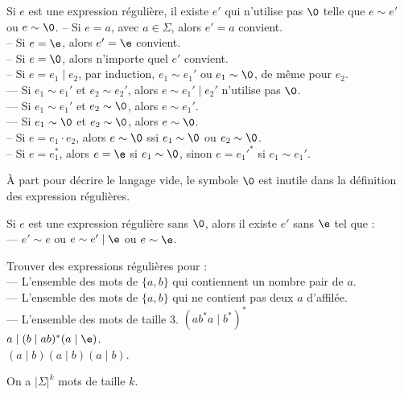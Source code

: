 \documentclass[french, 11pt]{article}
\renewcommand*{\S}{\Sigma}
\begin{document}
\begin{prop}{}{}
    Si $e$ est une expression régulière, il existe $e'$ qui n'utilise pas $\0$ telle que $e\sim e'$ ou $e\sim\0$.
    \tcblower
    -- Si $e=a$, avec $a\in\S$, alors $e'=a$ convient.\\
    -- Si $e=\e$, alors $e'=\e$ convient.\\
    -- Si $e=\0$, alors n'importe quel $e'$ convient.\\
    -- Si $e=e_1\mid e_2$, par induction, $e_1\sim e_1'$ ou $e_1\sim\0$, de même pour $e_2$.\\
    --- Si $e_1\sim e_1'$ et $e_2 \sim e_2'$, alors $e\sim e_1'\mid e_2'$ n'utilise pas $\0$.\\
    --- Si $e_1\sim e_1'$ et $e_2\sim\0$, alors $e\sim e_1'$.\\
    --- Si $e_1\sim \0$ et $e_2\sim \0$, alors $e\sim\0$.\\
    -- Si $e=e_1\cdot e_2$, alors $e\sim \0$ ssi $e_1\sim \0$ ou $e_2\sim \0$.\\
    -- Si $e=e_1^*$, alors $e=\e$ si $e_1\sim\0$, sinon $e=e_1'^*$ si $e_1\sim e_1'$.
\end{prop}

\begin{corr}{}{}
    À part pour décrire le langage vide, le symbole $\0$ est inutile dans la définition des expression régulières.
\end{corr}

\begin{prop}{}{}
    Si $e$ est une expression régulière sans $\0$, alors il existe $e'$ sans $\e$ tel que :\\
    --- $e'\sim e$ ou $e\sim e'\mid\e$ ou $e\sim \e$.
\end{prop}

\begin{ex}{}{}
    Trouver des expressions régulières pour :\\
    --- L'ensemble des mots de $\{a,b\}$ qui contiennent un nombre pair de $a$.\\
    --- L'ensemble des mots de $\{a,b\}$ qui ne contient pas deux $a$ d'affilée.\\
    --- L'ensemble des mots de taille 3.
    \tcblower
     $(ab^*a\mid b^*)^*$\\
     $a\mid(b \mid ab)^*(a\mid \e)$.\\
     $(a\mid b)(a\mid b)(a\mid b)$.
\end{ex}

\begin{prop}{}{}
    On a $|\Sigma|^k$ mots de taille $k$.
\end{prop}
\end{document}
